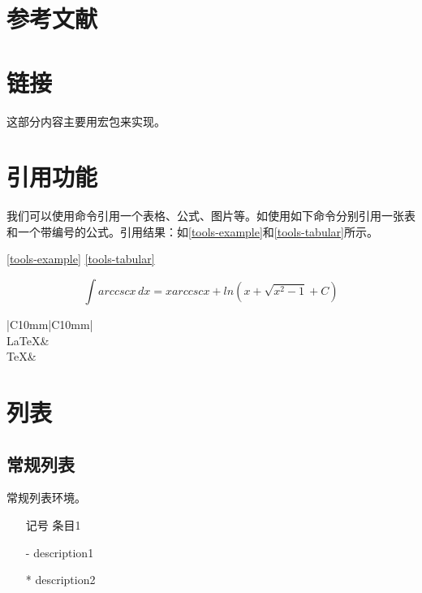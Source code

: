 \section{参考文献}

\section{链接}
这部分内容主要用宏包来实现。

\section{引用功能}
我们可以使用命令引用一个表格、公式、图片等。如使用如下命令分别引用一张表和一个带编号的公式。引用结果：如\autoref{tools-example}和\autoref{tools-tabular}所示。

\begin{latex}{}
\ref{tools-example}
\ref{tools-tabular}
\end{latex}

\begin{equation}\label{tools-example}
\int arccscx\,dx=xarccscx+ln(x+\sqrt{x^2-1}+C)
\end{equation}


\begin{table}[!ht]
\begin{center}
	\caption{\TeX 家族标识符}
	\begin{tabular}{|C{10mm}|C{10mm}|}
		\hline
		\\
		\hline
		\LaTeX & \LaTeXe\\
		\hline
		\TeX & \XeLaTeX\\
		\hline
	\end{tabular}
\end{center}
\end{table}

\section{列表}
\subsection{常规列表}
常规列表环境。

\begin{codeshow}
\begin{itemize}
	\item[记号] 条目1
	\item[-] description1
	\item[*] description2
\end{itemize}
\end{codeshow}

